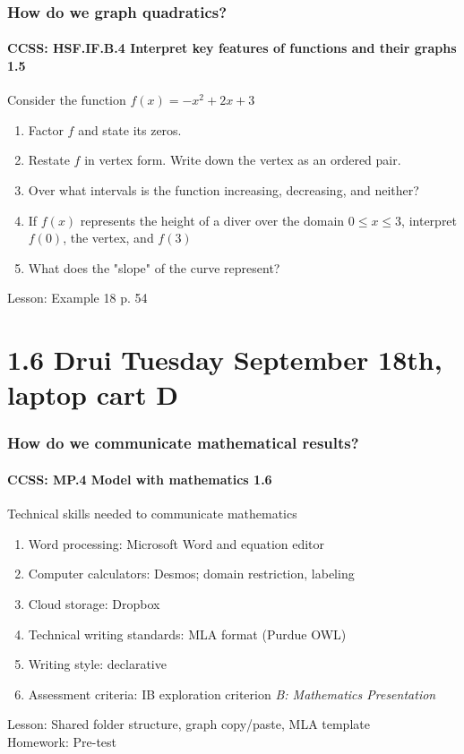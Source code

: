 \documentclass{beamer}
\begin{document}
  \frame
  {
    \frametitle{How do we graph quadratics?}
    \framesubtitle{CCSS: HSF.IF.B.4 Interpret key features of functions and their graphs  \alert{1.5}}

    \begin{block}{Consider the function $f(x)=-x^2+2x+3$}
    \begin{enumerate}
        \item Factor $f$ and state its zeros.
        \item Restate $f$ in vertex form. Write down the vertex as an ordered pair.
        \item Over what intervals is the function increasing, decreasing, and neither?
        \item If $f(x)$ represents the height of a diver over the domain $0 \leq x \leq 3$, interpret $f(0)$, the vertex, and $f(3)$
        \item What does the "slope" of the curve represent?
    \end{enumerate}
    Lesson: Example 18 p. 54
    \end{block}
  }


\section{1.6 Drui Tuesday September 18th, laptop cart D}
  \frame
  {
    \frametitle{How do we communicate mathematical results?}
    \framesubtitle{CCSS: MP.4 Model with mathematics  \alert{1.6}}

    \begin{block}{Technical skills needed to communicate mathematics}
    \begin{enumerate}
        \item Word processing: Microsoft Word and equation editor
        \item Computer calculators: Desmos; domain restriction, labeling
        \item Cloud storage: Dropbox
        \item Technical writing standards: MLA format (Purdue OWL)
        \item Writing style: declarative
        \item Assessment criteria: IB exploration criterion \emph{B: Mathematics Presentation}
    \end{enumerate}
    \end{block}
    Lesson: Shared folder structure, graph copy/paste, MLA template\\ \bigskip
    Homework: Pre-test
  }
\end{document}
